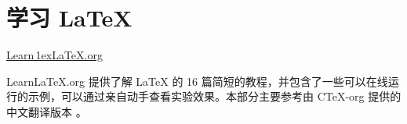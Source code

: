 
\part{学习 \LaTeX{}}

\begin{frame}[plain]
  \vfil
  \begin{center}
    \href{https://learnlatex.org}{
      \rmfamily
      Learn\,\lower1ex\hbox{\Huge\LaTeX{}}.org
    }
  \end{center}
  \vfil
  \begin{center}
    \parbox{0.75\linewidth}{
      Learn\LaTeX{}.org 提供了解 \LaTeX{} 的 16 篇简短的教程，并包含了一些可以在线运行的示例，可以通过亲自动手查看实验效果。本部分主要参考由 C\TeX{}-org 提供的中文翻译版本 。
    }
  \end{center}
  \vfil
\end{frame}

